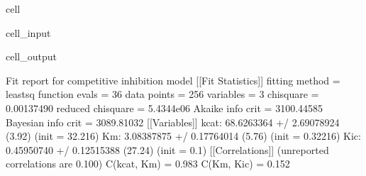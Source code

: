 \documentclass[letterpaper,10pt,english]{jupyterBook}
\begin{document}
\begin{sphinxuseclass}{cell}\begin{sphinxVerbatimInput}

\begin{sphinxuseclass}{cell_input}
\begin{sphinxVerbatim}[commandchars=\\\{\}]
\end{sphinxVerbatim}

\end{sphinxuseclass}\end{sphinxVerbatimInput}
\begin{sphinxVerbatimOutput}

\begin{sphinxuseclass}{cell_output}
\begin{sphinxVerbatim}[commandchars=\\\{\}]
Fit report for competitive inhibition model
[[Fit Statistics]]
    \PYGZsh{} fitting method   = leastsq
    \PYGZsh{} function evals   = 36
    \PYGZsh{} data points      = 256
    \PYGZsh{} variables        = 3
    chi\PYGZhy{}square         = 0.00137490
    reduced chi\PYGZhy{}square = 5.4344e\PYGZhy{}06
    Akaike info crit   = \PYGZhy{}3100.44585
    Bayesian info crit = \PYGZhy{}3089.81032
[[Variables]]
    k\PYGZus{}cat:  68.6263364 +/\PYGZhy{} 2.69078924 (3.92\PYGZpc{}) (init = 32.216)
    Km:     3.08387875 +/\PYGZhy{} 0.17764014 (5.76\PYGZpc{}) (init = 0.32216)
    K\PYGZus{}ic:   0.45950740 +/\PYGZhy{} 0.12515388 (27.24\PYGZpc{}) (init = 0.1)
[[Correlations]] (unreported correlations are \PYGZlt{} 0.100)
    C(k\PYGZus{}cat, Km) = 0.983
    C(Km, K\PYGZus{}ic)  = 0.152
\end{sphinxVerbatim}

\noindent{}

\end{sphinxuseclass}\end{sphinxVerbatimOutput}

\end{sphinxuseclass}
\end{document}
